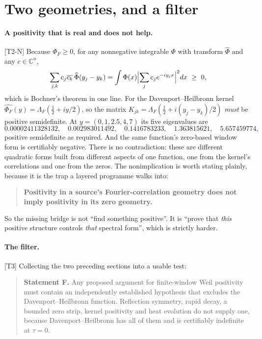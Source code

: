 \documentclass[11pt,a4paper]{article}
\theoremstyle{remark}
\newcommand{\tier}[1]{{\small\textsf{[#1]}}}
\newcommand{\PhiF}{\Phi_F}
\begin{document}
\section{Two geometries, and a filter}\label{sec:filter}

\paragraph{A positivity that is real and does not help.} \tier{T2-N} Because $\PhiF\ge0$, for
any nonnegative integrable $\Phi$ with transform $\widehat\Phi$ and any $c\in\mathbb C^n$,
\begin{equation}\label{eq:bochner}
  \sum_{j,k}c_j\overline{c_k}\,\widehat\Phi(y_j-y_k)
  =\int\Phi(x)\Bigl|\sum_jc_je^{-iy_jx}\Bigr|^2dx\ \ge\ 0 ,
\end{equation}
which is Bochner's theorem in one line. For the Davenport--Heilbronn kernel
$\widehat{\PhiF}(y)=\Lambda_F(\tfrac12+iy/2)$, so the matrix
$K_{jk}=\Lambda_F(\tfrac12+i(y_j-y_k)/2)$ \emph{must} be positive semidefinite. At
$y=(0,1,2.5,4,7)$ its five eigenvalues are
\[
  0.00002411328132,\quad 0.002983011492,\quad 0.1416783233,\quad
  1.363815621,\quad 5.657459774 ,
\]
positive semidefinite as required. And the same function's zero-based window form is
certifiably negative. There is no contradiction: these are different quadratic forms built
from different aspects of one function, one from the kernel's correlations and one from the
zeros. The nonimplication is worth stating plainly, because it is the trap a layered
programme walks into:

\begin{quote}
\textbf{Positivity in a source's Fourier-correlation geometry does not imply positivity in
its zero geometry.}
\end{quote}

So the missing bridge is not ``find something positive''. It is ``prove that \emph{this}
positive structure controls \emph{that} spectral form'', which is strictly harder.

\paragraph{The filter.} \tier{T3} Collecting the two preceding sections into a usable test:

\begin{quote}
\textbf{Statement F.} Any proposed argument for finite-window Weil positivity must contain
an independently established hypothesis that excludes the Davenport--Heilbronn function.
Reflection symmetry, rapid decay, a bounded zero strip, kernel positivity and heat evolution
do not supply one, because Davenport--Heilbronn has all of them and is certifiably
indefinite at $\tau=0$.
\end{quote}
\end{document}
